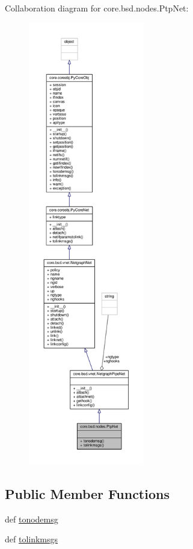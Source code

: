 Collaboration diagram for core.\+bsd.\+nodes.\+Ptp\+Net\+:
\nopagebreak
\begin{figure}[H]
\begin{center}
\leavevmode
\includegraphics[height=550pt]{classcore_1_1bsd_1_1nodes_1_1_ptp_net__coll__graph}
\end{center}
\end{figure}
\subsection*{Public Member Functions}
\begin{DoxyCompactItemize}
\item 
def \hyperlink{classcore_1_1bsd_1_1nodes_1_1_ptp_net_a926d970272338f22c35b9db44c815be7}{tonodemsg}
\item 
def \hyperlink{classcore_1_1bsd_1_1nodes_1_1_ptp_net_aadaf2b1fb29413b06ca3b56ec05456d7}{tolinkmsgs}
\end{DoxyCompactItemize}

